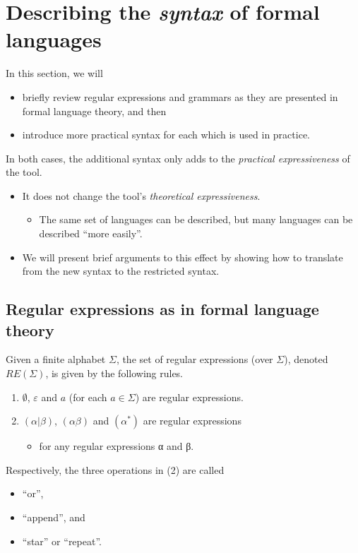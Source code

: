 \documentclass[11pt]{article}
\theoremstyle{definition}
\begin{document}
\section{Describing the \emph{syntax} of formal languages}
\label{sec:orgacaeba2}
In this section, we will
\begin{itemize}
\item briefly review regular expressions and grammars as
they are presented in formal language theory, and then
\item introduce more practical syntax for each
which is used in practice.
\end{itemize}

In both cases, the additional syntax only adds to
the \emph{practical expressiveness} of the tool.
\begin{itemize}
\item It does not change the tool's \emph{theoretical expressiveness}.
\begin{itemize}
\item The same set of languages can be described,
but many languages can be described “more easily”.
\end{itemize}
\item We will present brief arguments to this effect
by showing how to translate from the new syntax
to the restricted syntax.
\end{itemize}

\subsection{Regular expressions as in formal language theory}
\label{sec:org459a083}
Given a finite alphabet \(Σ\),
the set of regular expressions (over \(Σ\)),
denoted \(RE(Σ)\), is given
by the following rules.
\begin{enumerate}
\item \(∅\), \(ε\) and \(a\) (for each \(a ∈ Σ\)) are regular expressions.
\item \((α | β)\), \((αβ)\) and \((α^{*})\) are regular expressions
\begin{itemize}
\item for any regular expressions α and β.
\end{itemize}
\end{enumerate}

Respectively, the three operations in (2) are called
\begin{itemize}
\item “or”,
\item “append”, and
\item “star” or “repeat”.
\end{itemize}
\end{document}
